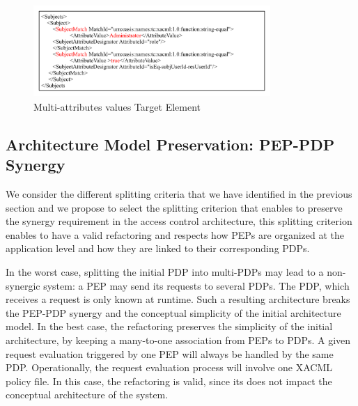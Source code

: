 \begin{figure}[!h]
\begin{center}
\includegraphics[width=9cm, height=3.5cm]{xacml-match}
\caption{Multi-attributes values Target Element}
\label{xacml-match}
\end{center}
\end{figure}



\subsection{Architecture Model Preservation: PEP-PDP Synergy}
We consider the different splitting criteria that we have identified in the previous section and we propose to select the splitting criterion that 
enables to preserve the synergy requirement in the access control architecture, this splitting criterion enables to have a valid refactoring and respects how PEPs are organized 
at the application level and how they are linked to their corresponding PDPs.

In the worst case, splitting the initial PDP into multi-PDPs may lead to a non-synergic system: a PEP may send its requests to several PDPs. 
The PDP, which receives a request is only known at runtime. Such a resulting architecture breaks the PEP-PDP synergy and the conceptual 
simplicity of the initial architecture model. In the best case, the refactoring preserves the simplicity of the initial architecture, by keeping a many-to-one association 
from PEPs to PDPs. A given request evaluation triggered by one PEP will always be handled by the same PDP. Operationally, the request evaluation process will involve 
one XACML policy file. In this case, the refactoring is valid, since its does not impact the conceptual architecture of the system.

